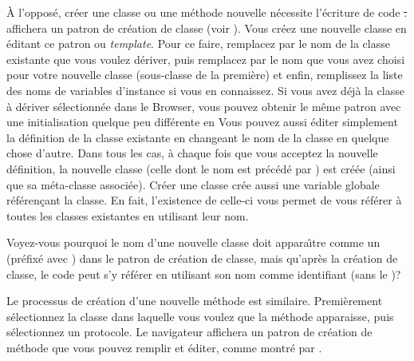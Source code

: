 \documentclass[a4paper,10pt,twoside]{book}
\begin{document}
\`A l'oppos\'e, cr\'eer une classe ou une m\'ethode nouvelle n\'ecessite 
l'\'ecriture de code \st.
affichera un patron de cr\'eation de classe
(voir ).
Vous cr\'eez une nouvelle classe en \'editant ce patron ou \emph{template}. Pour ce faire, remplacez  par le nom de la classe existante
que vous voulez d\'eriver, puis remplacez  par le nom
que vous avez choisi pour votre nouvelle classe (sous-classe de la premi\`ere) et enfin, remplissez la liste des noms de variables d'instance si vous en connaissez.  
Si vous avez d\'ej\`a la classe \`a d\'eriver s\'electionn\'ee dans 
le Browser, vous pouvez obtenir le m\^eme patron avec une initialisation
quelque peu diff\'erente en 
Vous pouvez aussi \'editer simplement la d\'efinition de la classe existante en changeant le nom de la classe en quelque chose d'autre.
Dans tous les cas, \`a chaque fois que vous acceptez la nouvelle d\'efinition, la nouvelle classe 
(celle dont le nom est pr\'ec\'ed\'e par \ct{#}) est cr\'e\'ee (ainsi que sa m\'eta-classe associ\'ee).  
Cr\'eer une classe cr\'ee aussi une variable globale r\'ef\'eren\c{c}ant
la classe. En fait, l'existence de celle-ci vous permet de vous 
r\'ef\'erer \`a toutes les classes existantes en utilisant leur nom.

Voyez-vous pourquoi le nom d'une nouvelle classe doit appara\^{\i}tre
comme un  (\ie pr\'efix\'e avec \ct{#}) dans le
patron de cr\'eation de classe, mais qu'apr\`es la cr\'eation
de classe, le code peut s'y r\'ef\'erer en utilisant
son nom comme identifiant (\ie sans le \ct{#})?

Le processus de cr\'eation d'une nouvelle m\'ethode
est similaire. Premi\`erement s\'electionnez la classe dans laquelle vous
voulez que la m\'ethode apparaisse, puis s\'electionnez un protocole.
Le navigateur affichera un patron de cr\'eation de m\'ethode que
vous pouvez remplir et \'editer, comme montr\'e par
.
\end{document}
